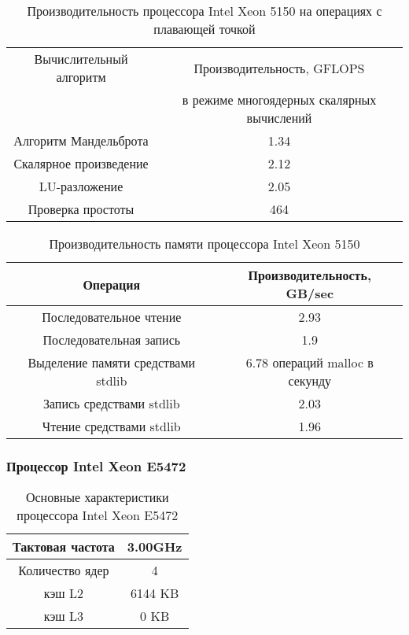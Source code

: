 \begin{table}[ht]
	\begin{center}
		\caption{Производительность процессора Intel Xeon  5150 на операциях с плавающей точкой}
		\begin{tabular}{|c|c|}
			\hline	
			Вычислительный алгоритм &  Производительность, GFLOPS \\ 
			& в режиме многоядерных скалярных вычислений \\ \hline
			Алгоритм Мандельброта  &  1.34 	\\ \hline
			Скалярное произведение &  2.12   \\ \hline
			LU-разложение          &  2.05   \\ \hline
			Проверка простоты      &  464  \\ \hline 
			
			
		\end{tabular}
	\end{center} 	
\end{table} 	

\begin{table}[ht]
	\begin{center}
		\caption{Производительность памяти процессора Intel Xeon 5150}
		\begin{tabular}{|c|c|}
			\hline	
			Операция  &  Производительность, GB/sec \\ \hline
			Последовательное чтение &  2.93 	\\  \hline
			Последовательная запись &  1.9   \\  \hline
			Выделение памяти средствами stdlib &  6.78 операций malloc в секунду  \\  \hline
			Запись средствами stdlib  & 2.03  \\ \hline
			Чтение средствами stdlib  & 1.96  \\ \hline 
		\end{tabular}
	\end{center} 	
\end{table} 	


\subsubsection{Процессор Intel Xeon E5472}
\begin{table}[ht]
	\begin{center}
		\caption{Основные характеристики процессора Intel Xeon  E5472}
		\begin{tabular}{|c|c|}
			\hline	
			Тактовая частота & 3.00GHz   \\ \hline
			Количество ядер & 4 	     \\ \hline
			кэш L2         &  6144 KB      \\ \hline
			кэш L3         &  0 KB        \\ \hline
		\end{tabular}
	\end{center} 	
\end{table} 	

